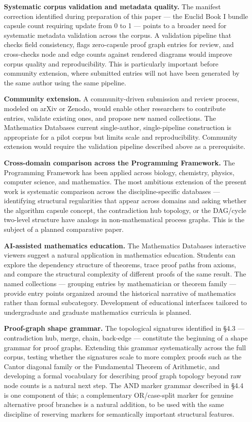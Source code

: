 \documentclass[
  11pt]{article}
\begin{document}
\textbf{Systematic corpus validation and metadata quality.} The manifest
correction identified during preparation of this paper --- the Euclid
Book I bundle capsule count requiring update from 0 to 1 --- points to a
broader need for systematic metadata validation across the corpus. A
validation pipeline that checks field consistency, flags zero-capsule
proof graph entries for review, and cross-checks node and edge counts
against rendered diagrams would improve corpus quality and
reproducibility. This is particularly important before community
extension, where submitted entries will not have been generated by the
same author using the same pipeline.

\textbf{Community extension.} A community-driven submission and review
process, modeled on arXiv or Zenodo, would enable other researchers to
contribute entries, validate existing ones, and propose new named
collections. The Mathematics Database\textquotesingle s current
single-author, single-pipeline construction is appropriate for a pilot
corpus but limits scale and reproducibility. Community extension would
require the validation pipeline described above as a prerequisite.

\textbf{Cross-domain comparison across the Programming Framework.} The
Programming Framework has been applied across biology, chemistry,
physics, computer science, and mathematics. The most ambitious extension
of the present work is systematic comparison across the
discipline-specific databases --- identifying structural regularities
that appear across domains and asking whether the algorithm capsule
concept, the contradiction hub topology, or the DAG/cycle two-level
structure have analogs in non-mathematical process graphs. This is the
subject of a planned comparative paper.

\textbf{AI-assisted mathematics education.} The Mathematics
Database\textquotesingle s interactive viewers suggest a natural
application in mathematics education. Students can explore the
dependency structure of theorems, trace proof paths from axioms, and
compare the structural complexity of different proofs of the same
result. The named collections --- grouping entries by mathematician or
theorem family --- provide entry points organized around the historical
narrative of mathematics rather than formal subcategory. Development of
educational interfaces tailored to undergraduate and graduate
mathematics curricula is planned.

\textbf{Proof-graph shape grammar.} The topological signatures
identified in §4.3 --- contradiction hub, merge, chain, back-edge ---
constitute the beginning of a shape grammar for proof graphs. Extending
this grammar systematically across the full corpus, testing whether the
signatures scale to more complex proofs such as the Cantor diagonal
family or the Fundamental Theorem of Arithmetic, and developing a formal
vocabulary for describing proof graph topology beyond raw node counts is
a natural next step. The AND marker grammar described in §4.4 is one
component of this; a complementary OR/case-split marker for genuine
alternative proof branches is a natural addition, to be used with the
same discipline of reserving markers for semantically important
structural features.
\end{document}
